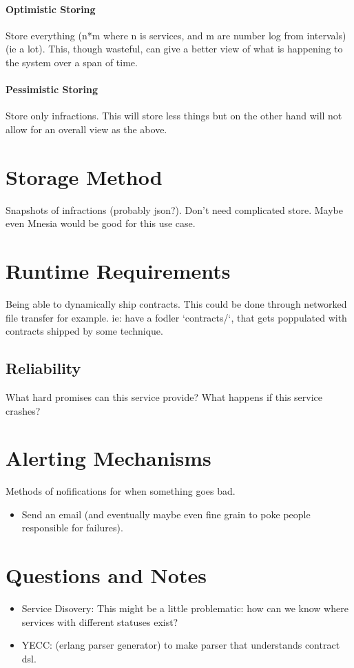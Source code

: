 \documentclass[12pt,twoside]{article}
\begin{document}
\paragraph{Optimistic Storing}
Store everything (n*m where n is services, and m are number log
from intervals) (ie a lot). This, though wasteful, can give a
better view of what is happening to the system over a span of
time.

\paragraph{Pessimistic Storing}
Store only infractions. This will store less things but on the
other hand will not allow for an overall view as the above.

\section{Storage Method}
Snapshots of infractions (probably json?). Don't need complicated
store. Maybe even Mnesia would be good for this use case.

\section{Runtime Requirements}
Being able to dynamically ship contracts. This could be done
through networked file transfer for example. ie: have a fodler
`contracts/`, that gets poppulated with contracts shipped by some
technique.

\subsection{Reliability}
What hard promises can this service provide?
What happens if this service crashes?

\section{Alerting Mechanisms}
Methods of nofifications for when something goes bad.
\begin{itemize}
  \item Send an email (and eventually maybe even fine grain to poke
    people responsible for failures).
\end{itemize}

\section{Questions and Notes}
\begin{itemize}
  \item{Service Disovery}: This might be a little problematic: how can
    we know where services with different statuses exist?
  \item{YECC}: (erlang parser generator) to make parser that
    understands contract dsl.
\end{itemize}
\end{document}
